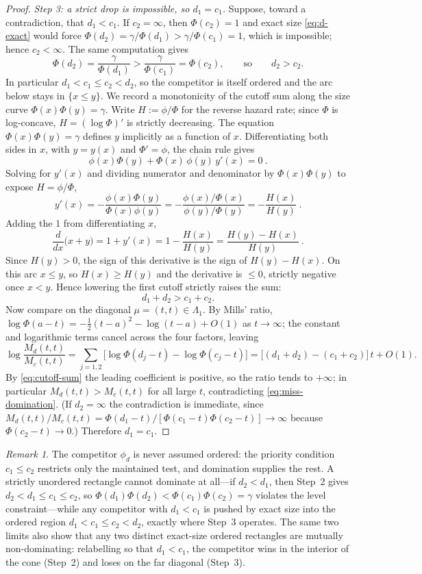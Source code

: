 \documentclass[12pt]{article}
\theoremstyle{definition}
\theoremstyle{remark}
\newtheorem{remark}{Remark}
\begin{document}
\begin{proof}
\emph{Step 3: a strict drop is impossible, so $d_1=c_1$.}
Suppose, toward a contradiction, that $d_1<c_1$. If $c_2=\infty$, then $\Phi(c_2)=1$ and exact size \eqref{eq:d-exact} would force $\Phi(d_2)=\gamma/\Phi(d_1)>\gamma/\Phi(c_1)=1$, which is impossible; hence $c_2<\infty$. The same computation gives
\[
\Phi(d_2)=\frac{\gamma}{\Phi(d_1)}>\frac{\gamma}{\Phi(c_1)}=\Phi(c_2),
\qquad\text{so}\qquad d_2>c_2.
\]
In particular $d_1<c_1\le c_2<d_2$, so the competitor is itself ordered and the arc below stays in $\{x\le y\}$.
We record a monotonicity of the cutoff sum along the size curve $\Phi(x)\Phi(y)=\gamma$. Write $H:=\phi/\Phi$ for the reverse hazard rate; since $\Phi$ is log-concave, $H=(\log\Phi)'$ is strictly decreasing. The equation $\Phi(x)\Phi(y)=\gamma$ defines $y$ implicitly as a function of $x$. Differentiating both sides in $x$, with $y=y(x)$ and $\Phi'=\phi$, the chain rule gives
\[
\phi(x)\Phi(y)+\Phi(x)\,\phi(y)\,y'(x)=0~.
\]
Solving for $y'(x)$ and dividing numerator and denominator by $\Phi(x)\Phi(y)$ to expose $H=\phi/\Phi$,
\[
y'(x)=-\frac{\phi(x)\Phi(y)}{\Phi(x)\phi(y)}
=-\frac{\phi(x)/\Phi(x)}{\phi(y)/\Phi(y)}
=-\frac{H(x)}{H(y)}~.
\]
Adding the $1$ from differentiating $x$,
\[
\frac{d}{dx}\bigl(x+y\bigr)=1+y'(x)=1-\frac{H(x)}{H(y)}=\frac{H(y)-H(x)}{H(y)}~.
\]
Since $H(y)>0$, the sign of this derivative is the sign of $H(y)-H(x)$.
On this arc $x\le y$, so $H(x)\ge H(y)$ and the derivative is $\le0$, strictly negative once $x<y$. Hence lowering the first cutoff strictly raises the sum:
\begin{equation}\label{eq:cutoff-sum}
d_1+d_2>c_1+c_2.
\end{equation}
Now compare on the diagonal $\mu=(t,t)\in\Lambda_1$. By Mills' ratio, $\log\Phi(a-t)=-\tfrac12(t-a)^2-\log(t-a)+O(1)$ as $t\to\infty$; the constant and logarithmic terms cancel across the four factors, leaving
\[
\log\frac{M_d(t,t)}{M_c(t,t)}
=\sum_{j=1,2}\bigl[\log\Phi(d_j-t)-\log\Phi(c_j-t)\bigr]
=\bigl[(d_1+d_2)-(c_1+c_2)\bigr]\,t+O(1).
\]
By \eqref{eq:cutoff-sum} the leading coefficient is positive, so the ratio tends to $+\infty$; in particular $M_d(t,t)>M_c(t,t)$ for all large $t$, contradicting \eqref{eq:miss-domination}. (If $d_2=\infty$ the contradiction is immediate, since $M_d(t,t)/M_c(t,t)=\Phi(d_1-t)/[\Phi(c_1-t)\Phi(c_2-t)]\to\infty$ because $\Phi(c_2-t)\to0$.) Therefore $d_1=c_1$.
\end{proof}
 
\begin{remark}
The competitor $\phi_d$ is never assumed ordered: the priority condition $c_1\le c_2$ restricts only the maintained test, and domination supplies the rest. A strictly unordered rectangle cannot dominate at all---if $d_2<d_1$, then Step~2 gives $d_2<d_1\le c_1\le c_2$, so $\Phi(d_1)\Phi(d_2)<\Phi(c_1)\Phi(c_2)=\gamma$ violates the level constraint---while any competitor with $d_1<c_1$ is pushed by exact size into the ordered region $d_1<c_1\le c_2<d_2$, exactly where Step~3 operates. The same two limits also show that any two distinct exact-size ordered rectangles are mutually non-dominating: relabelling so that $d_1<c_1$, the competitor wins in the interior of the cone (Step~2) and loses on the far diagonal (Step~3).
\end{remark}
\end{document}
